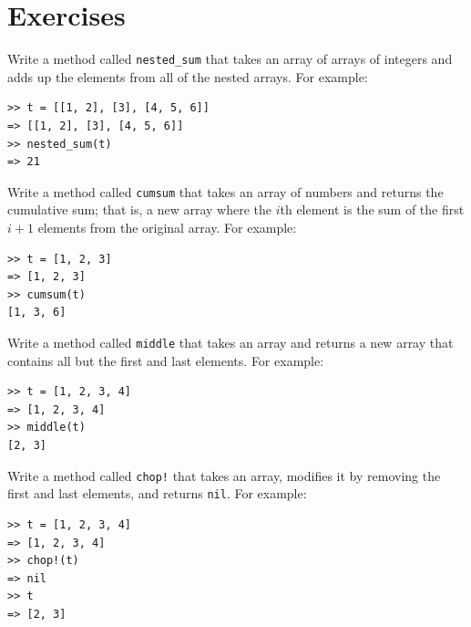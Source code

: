 \documentclass[10pt]{book}
\begin{document}
\section{Exercises}


\begin{exercise}

Write a method called \verb"nested_sum" that takes an array of arrays
of integers and adds up the elements from all of the nested arrays.
For example:

\begin{verbatim}
>> t = [[1, 2], [3], [4, 5, 6]]
=> [[1, 2], [3], [4, 5, 6]]
>> nested_sum(t)
=> 21
\end{verbatim}

\end{exercise}

\begin{exercise}
\label{cumulative}

Write a method called {\tt cumsum} that takes an array of numbers and
returns the cumulative sum; that is, a new array where the $i$th
element is the sum of the first $i+1$ elements from the original array.
For example:

\begin{verbatim}
>> t = [1, 2, 3]
=> [1, 2, 3]
>> cumsum(t)
[1, 3, 6]
\end{verbatim}

\end{exercise}

\begin{exercise}

Write a method called \verb"middle" that takes an array and
returns a new array that contains all but the first and last
elements.  For example:

\begin{verbatim}
>> t = [1, 2, 3, 4]
=> [1, 2, 3, 4]
>> middle(t)
[2, 3]
\end{verbatim}

\end{exercise}

\begin{exercise}

Write a method called \verb"chop!" that takes an array, modifies it
by removing the first and last elements, and returns {\tt nil}.
For example:

\begin{verbatim}
>> t = [1, 2, 3, 4]
=> [1, 2, 3, 4]
>> chop!(t)
=> nil
>> t
=> [2, 3]
\end{verbatim}

\end{exercise}
\end{document}
